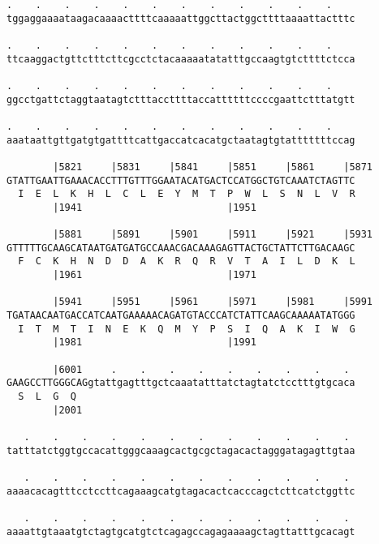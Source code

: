 \documentclass{article}
\begin{document}
\begin{Verbatim}
.    .    .    .    .    .    .    .    .    .    .    .    
tggaggaaaataagacaaaacttttcaaaaattggcttactggcttttaaaattactttc
                                                            
.    .    .    .    .    .    .    .    .    .    .    .    
ttcaaggactgttctttcttcgcctctacaaaaatatatttgccaagtgtcttttctcca
                                                            
.    .    .    .    .    .    .    .    .    .    .    .    
ggcctgattctaggtaatagtctttaccttttaccattttttccccgaattctttatgtt
                                                            
.    .    .    .    .    .    .    .    .    .    .    .    
aaataattgttgatgtgattttcattgaccatcacatgctaatagtgtatttttttccag
                                                            
        |5821     |5831     |5841     |5851     |5861     |5871
GTATTGAATTGAAACACCTTTGTTTGGAATACATGACTCCATGGCTGTCAAATCTAGTTC
  I  E  L  K  H  L  C  L  E  Y  M  T  P  W  L  S  N  L  V  R
        |1941                         |1951                 
  
        |5881     |5891     |5901     |5911     |5921     |5931
GTTTTTGCAAGCATAATGATGATGCCAAACGACAAAGAGTTACTGCTATTCTTGACAAGC
  F  C  K  H  N  D  D  A  K  R  Q  R  V  T  A  I  L  D  K  L
        |1961                         |1971                 
  
        |5941     |5951     |5961     |5971     |5981     |5991
TGATAACAATGACCATCAATGAAAAACAGATGTACCCATCTATTCAAGCAAAAATATGGG
  I  T  M  T  I  N  E  K  Q  M  Y  P  S  I  Q  A  K  I  W  G
        |1981                         |1991                 
  
        |6001     .    .    .    .    .    .    .    .    . 
GAAGCCTTGGGCAGgtattgagtttgctcaaatatttatctagtatctcctttgtgcaca
  S  L  G  Q                                                
        |2001                                               
  
   .    .    .    .    .    .    .    .    .    .    .    . 
tatttatctggtgccacattgggcaaagcactgcgctagacactagggatagagttgtaa
                                                            
   .    .    .    .    .    .    .    .    .    .    .    . 
aaaacacagtttcctccttcagaaagcatgtagacactcacccagctcttcatctggttc
                                                            
   .    .    .    .    .    .    .    .    .    .    .    . 
aaaattgtaaatgtctagtgcatgtctcagagccagagaaaagctagttatttgcacagt
                                                            

\end{Verbatim}
\end{document}
